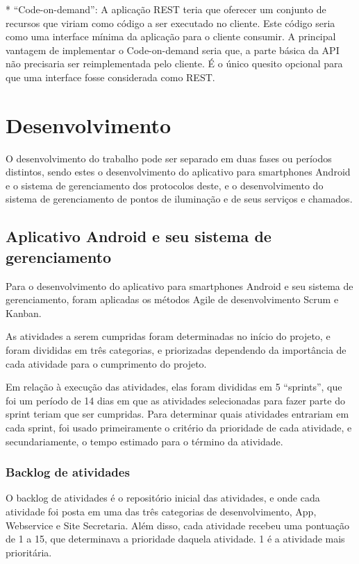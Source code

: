 \documentclass[
	article,			%
	11pt,				%
	oneside,			%
	a4paper,			%
	english,			%
	brazil,				%
	sumario=tradicional
	]{abntex2}
\begin{document}
* “Code-on-demand”: A aplicação REST teria que oferecer um conjunto de recursos
que viriam como código a ser executado no cliente. Este código seria como uma
interface mínima da aplicação para o cliente consumir. A principal vantagem de
implementar o Code-on-demand seria que, a parte básica da API não precisaria
ser reimplementada pelo cliente. É o único quesito opcional para que uma
interface fosse considerada como REST.

\section{Desenvolvimento}

O desenvolvimento do trabalho pode ser separado em duas fases ou períodos
distintos, sendo estes o desenvolvimento do aplicativo para smartphones Android
e o sistema de gerenciamento dos protocolos deste, e o desenvolvimento do
sistema de gerenciamento de pontos de iluminação e de seus serviços e chamados.


\subsection{Aplicativo Android e seu sistema de gerenciamento}

Para o desenvolvimento do aplicativo para smartphones Android e seu sistema de
gerenciamento, foram aplicadas os métodos Agile de desenvolvimento Scrum e Kanban.

As atividades a serem cumpridas foram determinadas no início do projeto, e
foram divididas em três categorias, e priorizadas dependendo da importância de
cada atividade para o cumprimento do projeto.

Em relação à execução das atividades, elas foram divididas em 5 “sprints”, que
foi um período de 14 dias em que as atividades selecionadas para fazer parte
do sprint teriam que ser cumpridas. Para determinar quais atividades entrariam
em cada sprint, foi usado primeiramente o critério da prioridade de cada
atividade, e secundariamente, o tempo estimado para o término da atividade.


\subsubsection{Backlog de atividades}

O backlog de atividades é o repositório inicial das atividades, e onde cada
atividade foi posta em uma das três categorias de desenvolvimento, App,
Webservice e Site Secretaria. Além disso, cada atividade recebeu uma pontuação
de 1 a 15, que determinava a prioridade daquela atividade. 1 é a atividade
mais prioritária.
\end{document}
